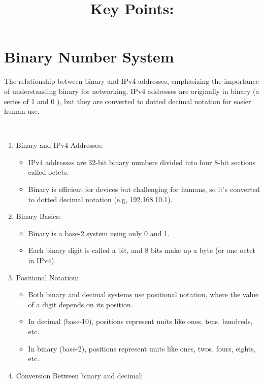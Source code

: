 \documentclass[a4paper,11pt]{article}
\begin{document}
\newpage
\section{Binary Number System}
The relationship between binary and IPv4 addresses, emphasizing the importance of understanding binary for networking. IPv4 addresses are originally in binary (a series of 1 and 0 ), but they are converted to dotted decimal notation for easier human use.\\

\title{Key Points:}\\
\begin{enumerate}
    \item Binary and IPv4 Addresses:\\
    \begin{itemize}
        \item IPv4 addresses are 32-bit binary numbers divided into four 8-bit sections called octets.\\
        \item Binary is efficient for devices but challenging for humans, so it's converted to dotted decimal notation (e.g, 192.168.10.1).
    \end{itemize}
    \item Binary Basics:\\
    \begin{itemize}
        \item Binary is a base-2 system using only 0 and 1.\\
        \item Each binary digit is called a bit, and 8 bits make up a byte (or one octet in IPv4).\\
    \end{itemize}
    \item Positional Notation:\\
    \begin{itemize}
        \item Both binary and decimal systems use positional notation, where the value of a digit depends on its position.\\
        \item In decimal (base-10), positions represent units like ones, tens, hundreds, etc.\\
        \item In binary (base-2), positions represent units like ones, twos, fours, eights, etc.\\
    \end{itemize}
    \item Conversion Between binary and decimal:\\

\end{enumerate}
\end{document}
